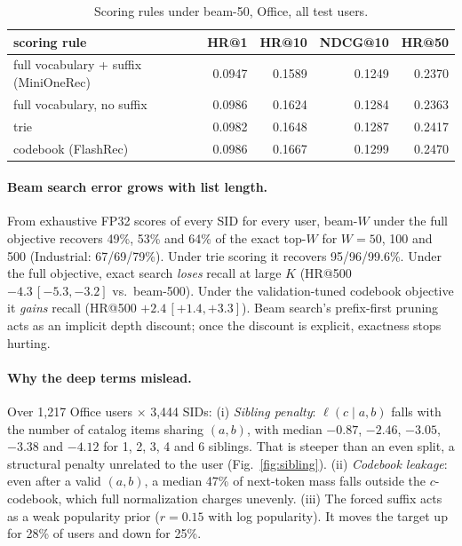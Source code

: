\documentclass[sigconf,anonymous]{acmart}
\newcommand{\lp}{\ell}
\begin{document}
\begin{table}[h]
\caption{Scoring rules under beam-50, Office, all test users.}
\label{tab:scoring}
\vspace{-2mm}
\footnotesize
\setlength{\tabcolsep}{3pt}
\begin{tabular*}{\linewidth}{@{\extracolsep{\fill}}lrrrr@{}}
\toprule
scoring rule & HR@1 & HR@10 & NDCG@10 & HR@50 \\
\midrule
full vocabulary + suffix (MiniOneRec) & 0.0947 & 0.1589 & 0.1249 & 0.2370 \\
full vocabulary, no suffix            & 0.0986 & 0.1624 & 0.1284 & 0.2363 \\
trie                                  & 0.0982 & 0.1648 & 0.1287 & 0.2417 \\
codebook (FlashRec)                   & 0.0986 & 0.1667 & 0.1299 & 0.2470 \\
\bottomrule
\end{tabular*}
\end{table}

\paragraph{Beam search error grows with list length.} From exhaustive FP32 scores of every SID for every user,
beam-$W$ under the full objective recovers 49\%, 53\% and 64\% of the exact top-$W$ for $W=50$, 100 and 500
(Industrial: 67/69/79\%). Under trie scoring it recovers 95/96/99.6\%. Under the full objective, exact search
\emph{loses} recall at large $K$ (HR@500 $-4.3\,[-5.3,-3.2]$ vs.\ beam-500). Under the validation-tuned codebook
objective it \emph{gains} recall (HR@500 $+2.4\,[+1.4,+3.3]$). Beam search's prefix-first pruning acts as an
implicit depth discount; once the discount is explicit, exactness stops hurting.

\paragraph{Why the deep terms mislead.} Over 1,217 Office users $\times$ 3,444 SIDs:
(i) \emph{Sibling penalty}: $\lp(c\mid a,b)$ falls with the number of catalog items sharing $(a,b)$, with median
$-0.87$, $-2.46$, $-3.05$, $-3.38$ and $-4.12$ for 1, 2, 3, 4 and 6 siblings. That is steeper than an even split,
a structural penalty unrelated to the user (Fig.~\ref{fig:sibling}).
(ii) \emph{Codebook leakage}: even after a valid $(a,b)$, a median 47\% of next-token mass falls outside the
$c$-codebook, which full normalization charges unevenly.
(iii) The forced suffix acts as a weak popularity prior ($r=0.15$ with log popularity). It moves the target up
for 28\% of users and down for 25\%.
\end{document}
